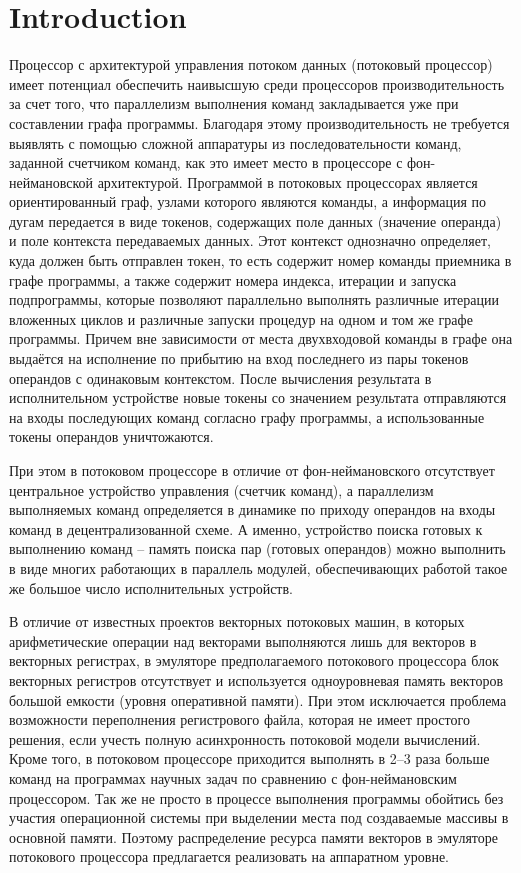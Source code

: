 \documentclass[
11pt,%
tightenlines,%
twoside,%
onecolumn,%
nofloats,%
nobibnotes,%
nofootinbib,%
superscriptaddress,%
noshowpacs,%
centertags]%
{revtex4}
\begin{document}
\section{Introduction}

Процессор с архитектурой управления потоком данных (потоковый процессор) имеет потенциал обеспечить наивысшую среди процессоров производительность за счет того, что параллелизм выполнения команд закладывается уже при составлении графа программы. Благодаря этому производительность не требуется выявлять с помощью сложной аппаратуры из последовательности команд, заданной счетчиком команд, как это имеет место в процессоре с фон-неймановской архитектурой. Программой в потоковых процессорах является ориентированный граф, узлами которого являются команды, а информация по дугам передается в виде токенов, содержащих поле данных (значение операнда) и поле контекста передаваемых данных. Этот контекст однозначно определяет, куда должен быть отправлен токен, то есть содержит номер команды приемника в графе программы, а также содержит номера индекса, итерации и запуска подпрограммы, которые позволяют параллельно выполнять различные итерации вложенных циклов и различные запуски процедур на одном и том же графе программы. Причем вне зависимости от места двухвходовой команды в графе она выдаётся на исполнение по прибытию на вход последнего из пары токенов операндов с одинаковым контекстом. После вычисления результата в исполнительном устройстве новые токены со значением результата отправляются на входы последующих команд согласно графу программы, а использованные токены операндов уничтожаются.

При этом в потоковом процессоре в отличие от фон-неймановского отсутствует центральное устройство управления (счетчик команд), а параллелизм выполняемых команд определяется в динамике по приходу операндов на входы команд в децентрализованной схеме. А именно, устройство поиска готовых к выполнению команд – память поиска пар (готовых операндов) можно выполнить в виде многих работающих в параллель модулей, обеспечивающих работой такое же большое число исполнительных устройств.

В отличие от известных проектов векторных потоковых машин, в которых арифметические операции над векторами выполняются лишь для векторов в векторных регистрах, в эмуляторе предполагаемого потокового процессора блок векторных регистров отсутствует и используется одноуровневая память векторов большой емкости (уровня оперативной памяти). При этом исключается проблема возможности переполнения регистрового файла, которая не имеет простого решения, если учесть полную асинхронность потоковой модели вычислений. Кроме того, в потоковом процессоре приходится выполнять в 2–3 раза больше команд на программах научных задач по сравнению с фон-неймановским процессором. Так же не просто в процессе выполнения программы обойтись без участия операционной системы при выделении места под создаваемые массивы в основной памяти. Поэтому распределение ресурса памяти векторов в эмуляторе потокового процессора предлагается реализовать на аппаратном уровне.
\end{document}
